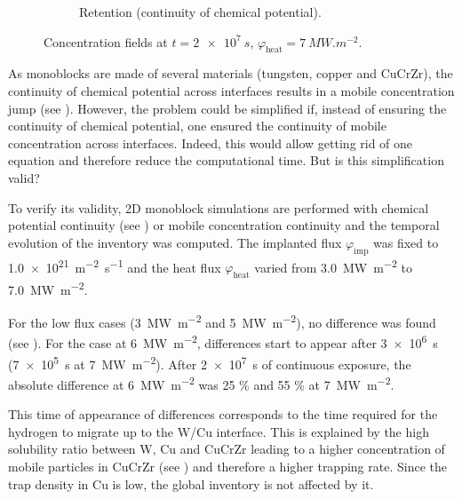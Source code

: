\begin{figure}
\begin{subfigure}{0.5\linewidth}
        \caption{Retention (continuity of chemical potential).}
    \end{subfigure}
    \caption{Concentration fields at $t=\SI{2e7}{s}$, $\varphi_\mathrm{heat} = \SI{7}{MW.m^{-2}}$.}
\end{figure}

As monoblocks are made of several materials (tungsten, copper and CuCrZr), the continuity of chemical potential across interfaces results in a mobile concentration jump (see ).
However, the problem could be simplified if, instead of ensuring the continuity of chemical potential, one ensured the continuity of mobile concentration across interfaces.
Indeed, this would allow getting rid of one equation and therefore reduce the computational time.
But is this simplification valid?

To verify its validity, 2D monoblock simulations are performed with chemical potential continuity (see ) or mobile concentration continuity and the temporal evolution of the inventory was computed.
The implanted flux $\varphi_\mathrm{imp}$ was fixed to \SI{1.0e21}{m^{-2}.s^{-1}} and the heat flux $\varphi_\mathrm{heat}$ varied from \SI{3.0}{MW.m^{-2}} to \SI{7.0}{MW.m^{-2}}.

For the low flux cases (\SI{3}{MW.m^{-2}} and \SI{5}{MW.m^{-2}}), no difference was found (see ).
For the case at \SI{6}{MW.m^{-2}}, differences start to appear after \SI{3e6}{s} (\SI{7e5}{s} at \SI{7}{MW.m^{-2}}).
After \SI{2e7}{s} of continuous exposure, the absolute difference at \SI{6}{MW.m^{-2}} was 25 \% and 55 \% at \SI{7}{MW.m^{-2}}.

This time of appearance of differences corresponds to the time required for the hydrogen to migrate up to the W/Cu interface.
This is explained by the high solubility ratio between W, Cu and CuCrZr leading to a higher concentration of mobile particles in CuCrZr (see ) and therefore a higher trapping rate.
Since the trap density in Cu is low, the global inventory is not affected by it.


